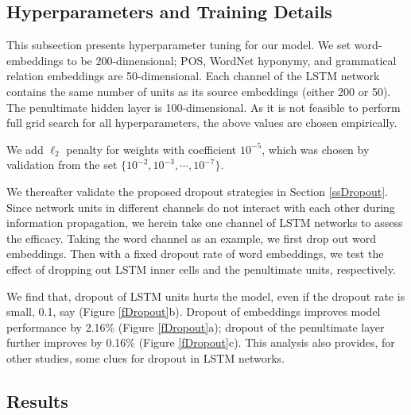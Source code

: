 \documentclass[11pt,a4paper]{article}
\begin{document}
\begin{figure*}[!t]
\caption{$F_1$-scores versus dropout rates. 
We first evaluate the effect of dropout embeddings (a). 
Then the dropout of the inner cells (b) and the penultimate layer (c) is tested with
word embeddings being dropped out by 0.5.}
\label{fDropout}
\end{figure*}


\subsection{Hyperparameters and Training Details}\label{ssSetting}
This subsection presents hyperparameter tuning for our model.
We set word-embeddings to be 200-dimensional;
POS, WordNet hyponymy, and grammatical relation embeddings are 50-dimensional.
Each channel of the LSTM network contains the same number of units as its source embeddings
(either 200 or 50). The penultimate hidden layer is 100-dimensional.
As it is not feasible to perform full grid search for all hyperparameters,
the above values are chosen empirically.

We add $\ell_2$ penalty for weights with coefficient $10^{-5}$,
which was chosen by validation
from the set $\{10^{-2}, 10^{-3}, \cdots, 10^{-7}\}$.

We thereafter validate the proposed dropout strategies in Section \ref{ssDropout}.
Since network units in different channels do not interact with each other during information propagation,
we herein take one channel of LSTM networks to assess the efficacy.
Taking the word channel as an example, we first drop out word embeddings.
Then with a fixed dropout rate of word embeddings,  we test the effect of dropping out LSTM inner cells
and the penultimate units, respectively.

We find that, dropout of LSTM units hurts the model,
even if the dropout rate is small, 0.1, say (Figure \ref{fDropout}b).
Dropout of embeddings improves model performance by 2.16\% (Figure \ref{fDropout}a);
dropout of the penultimate layer further improves by 0.16\% (Figure \ref{fDropout}c).
This analysis also provides, for other studies, some clues for dropout in LSTM networks.

\subsection{Results}\label{ssResult}
\end{document}
